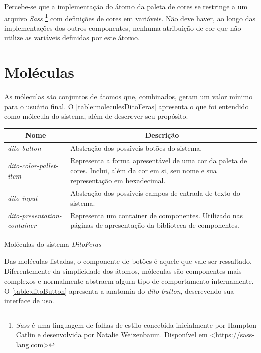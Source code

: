 Percebe-se que a implementação do átomo da paleta de cores se restringe a um arquivo \textit{Sass} \footnote{\textit{Sass} é uma linguagem de folhas de estilo concebida inicialmente por Hampton Catlin e desenvolvida por Natalie Weizenbaum. Disponível em <https://sass-lang.com>} com definições de cores em variáveis. Não deve haver, ao longo das implementações dos outros componentes, nenhuma atribuição de cor que não utilize as variáveis definidas por este átomo.

\section{Moléculas}

As móleculas são conjuntos de átomos que, combinados, geram um valor mínimo para o usuário final. O \autoref{table:moleculesDitoFeras} apresenta o que foi entendido como mólecula do sistema, além de descrever seu propósito.

\begin{quadro}
\centering
\begin{tabular}{|m{4cm}|m{10cm}|} \hline
	
	\multicolumn{1}{|c|}{\bfseries Nome} & \multicolumn{1}{c|}{\bfseries Descrição} \\\hline
	
	 \textit{dito-button} & Abstração dos possíveis botões do sistema. \\\hline
	 
	 \textit{dito-color-pallet-item} & Representa a forma apresentável de uma cor da paleta de cores. Inclui, além da cor em si, seu nome e sua representação em hexadecimal. \\\hline
	 
	 \textit{dito-input} & Abstração dos possíveis campos de entrada de texto do sistema. \\\hline
	 
	 \textit{dito-presentation-container} & Representa um container de componentes. Utilizado nas páginas de apresentação da biblioteca de componentes. \\\hline
    
\end{tabular}
\caption{Moléculas do sistema \textit{DitoFeras}}
\label{table:moleculesDitoFeras}
\end{quadro}

Das moléculas listadas, o componente de botões é aquele que vale ser ressaltado. Diferentemente da simplicidade dos átomos, móleculas são componentes mais complexos e normalmente abstraem algum tipo de comportamento internamente. O \autoref{table:ditoButton} apresenta a anatomia do \textit{dito-button}, descrevendo sua interface de uso.

